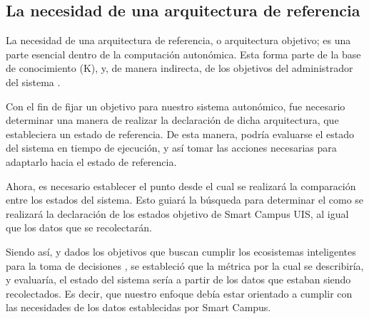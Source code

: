 \subsection{La necesidad de una arquitectura de referencia}

La necesidad de una arquitectura de referencia, o arquitectura objetivo; es una parte esencial dentro de la computación autonómica. Esta forma parte de la base de conocimiento (K), y, de manera indirecta, de los objetivos del administrador del sistema \cite[p. 24]{lalanda_diaconescu_mccann_2014}. 

Con el fin de fijar un objetivo para nuestro sistema autonómico, fue necesario determinar una manera de realizar la declaración de dicha arquitectura, que estableciera un estado de referencia. De esta manera, podría evaluarse el estado del sistema en tiempo de ejecución,  y así tomar las acciones necesarias para adaptarlo hacia el estado de referencia. 


Ahora, es necesario establecer el punto desde el cual se realizará la comparación entre los estados del sistema. Esto guiará la búsqueda para determinar el como se realizará la declaración de los estados objetivo de Smart Campus UIS, al igual que los datos que se recolectarán.

Siendo así, y dados los objetivos que buscan cumplir los ecosistemas inteligentes para la toma de decisiones \cite{Anagnostopoulos_2023}, se estableció que la métrica por la cual se describiría, y evaluaría, el estado del sistema sería a partir de los datos que estaban siendo recolectados. Es decir, que nuestro enfoque debía estar orientado a cumplir con las necesidades de los datos establecidas por Smart Campus. 